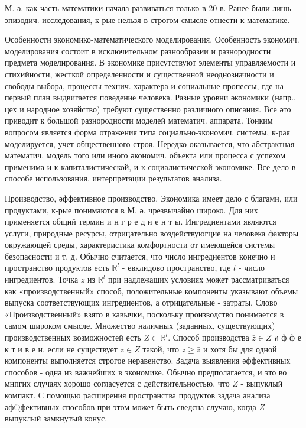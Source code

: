 \documentclass[10pt]{article}
\begin{document}
М. ә. как часть математики начала развиваться только в 20 в. Ранее были лишь эпизодич. исследования, к-рые нельзя в строгом смысле отнести к математике.



Особенности экономико-математического моделирования. Особенность экономич. моделирования состоит в исключительном разнообразии и разнородности предмета моделирования. В экономике присутствуют элементы управляемости и стихийности, жесткой определенности и существенной неоднозначности и свободы выбора, процессы технич. характера и социальные пропессы, где на первый план выдвигается поведение человека. Разные уровни әкономики (напр., цех и народное хозяйство) требуют существенно различного описания. Все әто приводит к большой разнородности моделей математич. аппарата. Тонким вопросом является форма отражения типа социально-экономич. системы, к-рая моделируется, учет общественного строя. Нередко оказывается, что абстрактная математич. модель того или иного әкономич. объекта или процесса с успехом применима и к капиталистической, и к социалистической экономике. Все дело в способе использования, интерпретации результатов анализа.



Производство, әффективное производство. Экономика имеет дело с благами, или продуктами, к-рые понимаются в М. ә. чрезвычайно широко. Для них применяется общий термин и н г р е д и е н т ы. Ингредиентами являются услуги, природные ресурсы, отрицательно воздействуюгцие на человека факторы окружающей среды, характеристика комфортности от имеющейся системы безопасности и т. д. Обычно считается, что число ингредиентов конечно и пространство продуктов есть $\mathbb{R}^{l}$ - евклидово пространство, где $l$ - число ингредиентов. Точка $z$ из $\mathbb{R}^{l}$ при надлежащих условиях может рассматриваться как «производственный» способ, положительные компоненты указывают объемы выпуска соответствующих ингредиентов, а отрицательные - затраты. Слово «Производственный» взято в кавычки, поскольку производство понимается в самом широком смысле. Множество наличных (заданных, существующих) производственных возможностей есть $Z \subset \mathbb{R}^{l}$. Способ производства $\bar{z} \in Z$ ค ф ф е к т и в е н, если не существует $z \in Z$ такой, что $z \geqslant \bar{z}$ и хотя бы для одной компоненты выполняется строгое неравенство. Задача выявления әффективных способов - одна из важнейших в экономике. Обычно предполагается, и это во мнпгих случаях хорошо согласуется с действительностью, что $Z$ - выпуклый компакт. С помощью расширения пространства продуктов задача анализа әф্фективных способов при этом может быть сведсна случаю, когда $Z$ - выпуклый замкнутый конус.
\end{document}
